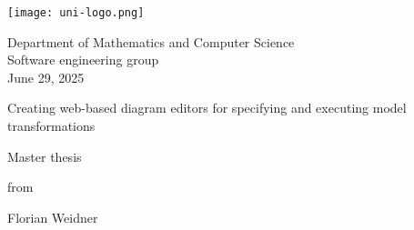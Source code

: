 \begin{titlepage}


\raggedleft

\vspace*{-4cm}

\hspace*{8cm}
\texttt{[image: uni-logo.png]}

\centering
\Large
Department of Mathematics and Computer Science  
\vspace{0.5cm}\\

\normalsize
Software engineering group \\
June 29, 2025

\vspace{1.5cm}
\LARGE
Creating web-based diagram editors for specifying and executing model transformations

\vspace{1cm}
\Large
Master thesis

\vspace*{\fill}

\Large
from

\vspace{0.5cm}
\LARGE
Florian Weidner \vspace{1cm}

\vspace{1cm}

\vspace*{\fill}

\end{titlepage}